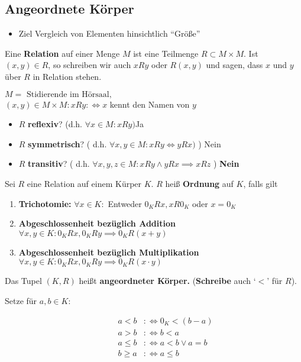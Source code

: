 \documentclass[consecutivenumbering]{gadsescript}
\begin{document}
\subsection{Angeordnete Körper}
\begin{itemize}
	\item Ziel Vergleich von Elementen hinsichtlich ``Größe''
\end{itemize}
\begin{subdefinition}
	Eine \textbf{Relation} auf einer Menge $M$ ist eine Teilmenge $ R\subset M\times M $. Ist $ ( x, y ) \in R $, so schreiben wir auch $xRy$ oder $ R(x,y) $ und sagen, dass $x $ und $ y $ über $ R $ in Relation stehen.
\end{subdefinition}
\begin{subexample}
	$ M = \text{ Stidierende im Hörsaal,}$\\
	$ (x,y) \in M \times M : x R y :\iff x $ kennt den Namen von $ y $
	\begin{itemize}
		\item $ R $ \textbf{reflexiv}? (d.h. $\forall x \in M : x R y ) $\qquad Ja
		\item $ R $ \textbf{symmetrisch}? ( d.h. $\forall x, y \in M : x R y \iff y R x ) $ ) \qquad Nein
		\item $ R $ \textbf{transitiv}? ( d.h. $ \forall x, y, z \in M : xRy \wedge yRx \implies xRz $ ) \qquad \textbf{Nein}
	\end{itemize}
\end{subexample}
\begin{subdefinition}
	Sei $ R $ eine Relation auf einem Kürper $ K $. $ R $ heiß \textbf{Ordnung} auf $ K $, falls gilt
	\begin{enumerate}[label=(\roman*)]
		\item \textbf{Trichotomie:} $ \forall x \in K: $ Entweder $ 0_K Rx, x R0_K $ oder $ x = 0_K $
		\item \textbf{Abgeschlossenheit bezüglich Addition} $ \forall x,y \in K : 0_K R x, 0_K R y \implies 0_K R (x+y)$
		\item \textbf{Abgeschlossenheit bezüglich Multiplikation} $ \forall x, y \in K: 0_K R x, 0_KRy \implies 0_K R (x\cdot y) $
	\end{enumerate}
	Das Tupel $ ( K, R ) $ heißt \textbf{angeordneter Körper.} (\textbf{Schreibe} auch `$<$' für  $ R $).
	\begin{description}
		\item[Setze für $a,b \in K $:]
			\begin{align*}
				a < b &:\iff 0_K < ( b- a )\\
				a > b &:\iff b < a\\
				a \leq b &:\iff a < b \vee a = b\\
				b \geq a &:\iff a \leq b\\
			\end{align*}
	\end{description}
\end{subdefinition}
\end{document}
